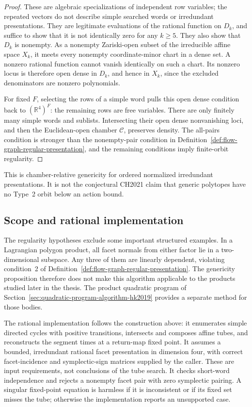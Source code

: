 \begin{proof}
These are algebraic specializations of independent row variables; the
repeated vectors do not describe simple searched words or irredundant
presentations.  They are legitimate evaluations of the rational function
on \(D_k\), and suffice to show that it is not identically zero for any
\(k\geq5\).  They also show that \(D_k\) is nonempty.  As a nonempty
Zariski-open subset of the irreducible affine space \(X_k\), it meets every
nonempty coordinate-minor chart in a dense set.  A nonzero rational function
cannot vanish identically on such a chart.  Its nonzero locus is therefore
open dense in \(D_k\), and hence in \(X_k\), since the excluded denominators
are nonzero polynomials.

For fixed \(F\), selecting the rows of a simple word pulls this open dense
condition back to \((\mathbb R^4)^F\): the remaining rows are free variables.
There are only finitely many simple words and sublists.  Intersecting their
open dense nonvanishing loci, and then the Euclidean-open chamber
\(\mathcal C\), preserves density.  The all-pairs condition is stronger than
the nonempty-pair condition in
Definition~\ref{def:flow-graph-regular-presentation}, and the remaining
conditions imply finite-orbit regularity.
\end{proof}

This is chamber-relative genericity for ordered normalized irredundant
presentations.  It is not the conjectural CH2021 claim that generic polytopes
have no Type~2 orbit below an action bound.



\subsection{Scope and rational implementation}
\label{subsec:flow-graph-algorithm-ch2021-implementation}

The regularity hypotheses exclude some important structured examples.
In a Lagrangian polygon product, all facet normals from either factor lie in a
two-dimensional subspace.  Any three of them are linearly dependent, violating
condition~2 of Definition~\ref{def:flow-graph-regular-presentation}.
The genericity proposition therefore does not make this algorithm applicable
to the products studied later in the thesis.  The product quadratic program
of Section~\ref{sec:quadratic-program-algorithm-hk2019} provides a separate method
for those bodies.

The rational implementation follows the construction above: it enumerates
simple directed cycles with positive transitions, intersects and composes
affine tubes, and reconstructs the segment times at a return-map fixed point.
It assumes a bounded, irredundant rational facet presentation in dimension
four, with correct facet-incidence and symplectic-sign matrices supplied by
the caller.  These are input requirements, not conclusions of the tube search.
It checks short-word independence and rejects a nonempty facet pair with zero
symplectic pairing.  A singular fixed-point equation is harmless if it is
inconsistent or if its fixed set misses the tube; otherwise the implementation
reports an unsupported case.

